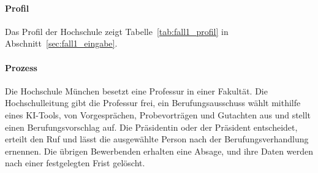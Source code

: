 \paragraph{Profil} Das Profil der Hochschule zeigt Tabelle~\ref{tab:fall1_profil} in Abschnitt~\ref{sec:fall1_eingabe}.
\paragraph{Prozess} Die Hochschule München besetzt eine Professur in einer Fakultät. Die Hochschulleitung gibt die Professur frei, ein Berufungsausschuss wählt mithilfe eines KI-Tools, von Vorgesprächen, Probevorträgen und Gutachten aus und stellt einen Berufungsvorschlag auf. Die Präsidentin oder der Präsident entscheidet, erteilt den Ruf und lässt die ausgewählte Person nach der Berufungsverhandlung ernennen. Die übrigen Bewerbenden erhalten eine Absage, und ihre Daten werden nach einer festgelegten Frist gelöscht.
